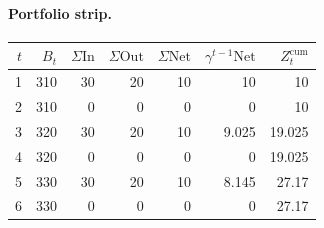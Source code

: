 \documentclass[12pt, a4paper]{article}
\begin{document}
\paragraph{Portfolio strip.}
\begin{center}
\begin{tabular}{rrrrrrr}
\toprule
$t$ & $B_t$ & $\Sigma\mathrm{In}$ & $\Sigma\mathrm{Out}$ & $\Sigma\mathrm{Net}$ & $\gamma^{t-1}\mathrm{Net}$ & $Z_t^{\mathrm{cum}}$\\
\midrule
1 & 310 & 30 & 20 & 10 & 10 & 10 \\
2 & 310 & 0 & 0 & 0 & 0 & 10 \\
3 & 320 & 30 & 20 & 10 & 9.025 & 19.025 \\
4 & 320 & 0 & 0 & 0 & 0 & 19.025 \\
5 & 330 & 30 & 20 & 10 & 8.145 & 27.17 \\
6 & 330 & 0 & 0 & 0 & 0 & 27.17 \\
\bottomrule
\end{tabular}
\end{center}
\end{document}
